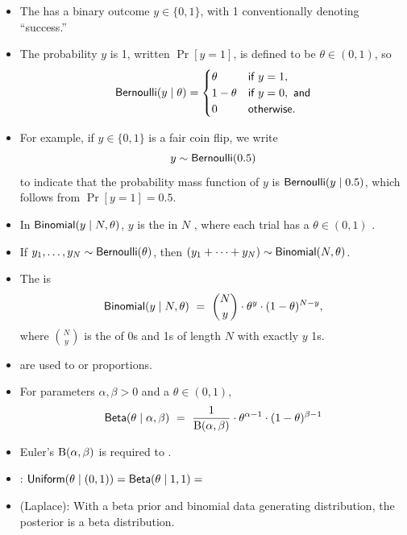 \documentclass[10pt]{report}
\begin{document}
%
\begin{itemize}
\item The  has a binary outcome $y \in \{ 0, 1 \}$,
  with 1 conventionally denoting ``success.''
\item The probability $y$ is 1, written $\Pr[y = 1]$, is defined to be $\theta \in (0,1)$, so
$$
  \text{\sf Bernoulli}(y \mid \theta)
  = \begin{cases}
    \theta & \textsf{if } y = 1,
    \\
    1 - \theta & \textsf{if } y = 0, \textsf{ and}
    \\
    0 & \textsf{otherwise}.
    \end{cases}
    $$
  \item For example, if $y \in \{ 0, 1 \}$ is a fair coin flip, we write
    $$
    y \sim \text{\sf Bernoulli}(0.5)
    $$
    to indicate that the probability mass function of $y$ is $\text{\sf Bernoulli}(y \mid 0.5)$,
    which follows from $\Pr[y = 1] = 0.5$.
\end{itemize}


%
\begin{itemize}
\item In $\text{\sf Binomial}(y \mid N, \theta)$,
  $y$ is the  in $N$ , where each trial has
  a $\theta \in (0, 1)$ .
\item If $y_1,\ldots,y_N\sim \text{\sf Bernoulli}(\theta)$,
then $(y_1 + \cdots + y_N) \sim \text{\sf Binomial}(N,\theta)$.
\item The  is
\[
\text{\sf Binomial}(y \mid N,\theta)
\ = \ \binom{N}{y} \cdot \theta^{y} \cdot (1 - \theta)^{N-y},
\]
where  $\binom{N}{y}$ is the  of 0s and 1s of length $N$ with exactly $y$ 1s.  
\end{itemize}



%
\begin{itemize}
\item {} are used to  or proportions.
\item For parameters $\alpha, \beta > 0$ and a  $\theta \in (0,1)$, 
\[
\text{\sf Beta}(\theta \mid \alpha,\beta) 
\ = \ \frac{1}{{\text B}(\alpha,\beta)}
      \cdot \theta^{\alpha - 1} 
      \cdot (1 - \theta)^{\beta-1}
\]
\item Euler's  ${\text B}(\alpha, \beta)$ is required to .
\item {}:
  $\text{\sf Uniform}(\theta\mid (0,1)) = \text{\sf Beta}(\theta \mid 1, 1) = $
\item {} (Laplace): With a beta prior and binomial data generating
  distribution, the posterior is a beta distribution.
\end{itemize}
\end{document}
